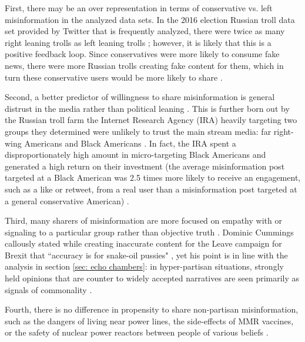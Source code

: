 \documentclass[preprint,review,12pt]{elsarticle}
\begin{document}
First, there may be an over representation in terms of conservative vs. left misinformation in the analyzed data sets. In the 2016 election Russian troll data set provided by Twitter that is frequently analyzed, there were twice as many right leaning trolls as left leaning trolls \cite{freelon2020black,badawy2018analyzing,benkler2018network}; however, it is likely that this is a positive feedback loop. Since conservatives were more likely to consume fake news, there were more Russian trolls creating fake content for them, which in turn these conservative users would be more likely to share \cite{bakir2018fake,bodo2019interested,silverman2016analysis,pariser2011filter}. 

Second, a better predictor of willingness to share misinformation is general distrust in the media rather than political leaning \cite{hopp2020people,shin2017partisan,kahan2012ideology,lewandowsky2016motivated,swire2017processing,mourao2019fake}. This is further born out by the Russian troll farm the Internet Research Agency (IRA) heavily targeting two groups they determined were unlikely to trust the main stream media: far right-wing Americans and Black Americans \cite{diresta2019tactics,howard2019ira,boatwright2018troll,jamieson2020cyberwar,mueller2019mueller,freelon2020black}. In fact, the IRA spent a disproportionately high amount in micro-targeting Black Americans and generated a high return on their investment (the average misinformation post targeted at a Black American was 2.5 times more likely to receive an engagement, such as a like or retweet, from a real user than a misinformation post targeted at a general conservative American) \cite{howard2019ira,freelon2020black}.

Third, many sharers of misinformation are more focused on empathy with or signaling to a particular group rather than objective truth \cite{winter2015they,rheault2016measuring,dale2017nlp, connelly2011signaling,lampe2007familiar,spence2002signaling}. Dominic Cummings callously stated while creating inaccurate content for the Leave campaign for Brexit that ``accuracy is for snake-oil pussies" \cite{crace2016accuracy}, yet his point is in line with the analysis in section \ref{sec: echo chambers}: in hyper-partisan situations, strongly held opinions that are counter to widely accepted narratives are seen primarily as signals of commonality \cite{yla2018populist,noppari2019user,lazer2018science,yla2019politicization,wasilewski2019us,freelon2020russian}. 

Fourth, there is no difference in propensity to share non-partisan misinformation, such as the dangers of living near power lines, the side-effects of MMR vaccines, or the safety of nuclear power reactors between people of various beliefs \cite{kahan2015climate,hara2016co,kahan2012ideology,lewandowsky2016motivated,barbera2015tweeting}.
\end{document}
